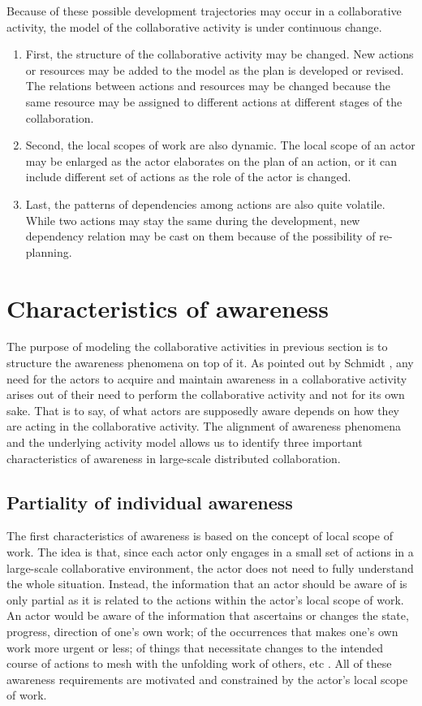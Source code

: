 Because of these possible development trajectories may occur in a collaborative activity, the model of the collaborative activity is under continuous change. 
\begin{enumerate}
	\item First, the structure of the collaborative activity may be changed. New actions or resources may be added to the model as the plan is developed or revised. The relations between actions and resources may be changed because the same resource may be assigned to different actions at different stages of the collaboration.
	\item Second, the local scopes of work are also dynamic.  The local scope of an actor may be enlarged as the actor elaborates on the plan of an action, or it can include different set of actions as the role of the actor is changed.
	\item Last, the patterns of dependencies among actions are also quite volatile. While two actions may stay the same during the development, new dependency relation may be cast on them because of the possibility of re-planning.
\end{enumerate}

\section{Characteristics of awareness} %
\label{sec:awareness_requirements}
The purpose of modeling the collaborative activities in previous section is to structure the awareness phenomena on top of it. As pointed out by Schmidt \cite{schmidt2002a}, any need for the actors to acquire and maintain awareness in a collaborative activity arises out of their need to perform the collaborative activity and not for its own sake. That is to say, of what actors are supposedly aware depends on how they are acting in the collaborative activity. The alignment of awareness phenomena and the underlying activity model allows us to identify three important characteristics of awareness in large-scale distributed collaboration.

\subsection{Partiality of individual awareness} %
\label{sub:partiality_of_awareness}
The first characteristics of awareness is based on the concept of local scope of work. The idea is that, since each actor only engages in a small set of actions in a large-scale collaborative environment, the actor does not need to fully understand the whole situation. Instead, the information that an actor should be aware of is only partial as it is related to the actions within the actor's local scope of work. An actor would be aware of the information that ascertains or changes the state, progress, direction of one's own work; of the occurrences that makes one's own work more urgent or less; of things that necessitate changes to the intended course of actions to mesh with the unfolding work of others, etc \cite{schmidt2002a}. All of these awareness requirements are motivated and constrained by the actor's local scope of work.


